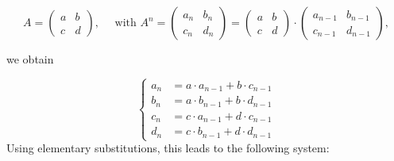 \documentclass[oneside,10pt]{book}
\renewcommand{\arraystretch}{1.4} %
\begin{document}
\renewcommand{\arraystretch}{1.0} %

\begin{equation*}
A =
\begin{pmatrix}
a & b \\
c & d
\end{pmatrix},
\quad
\text{ with }
A^n =
\begin{pmatrix}
a_n & b_n \\
c _n & d_n
\end{pmatrix}
=
\begin{pmatrix}
a & b \\
c & d
\end{pmatrix}
\cdot
\begin{pmatrix}
a_{n-1} & b_{n-1} \\
c_{n-1} & d_{n-1}
\end{pmatrix},
\end{equation*}

\noindent we obtain

\begin{equation*}
  \left\{
    \begin{aligned}
      a_n & =a\cdot a_{n-1}+b\cdot c_{n-1}\\
      b_n & =a\cdot b_{n-1}+b\cdot d_{n-1}\\
      c_n & =c\cdot a_{n-1}+d\cdot c_{n-1}\\
      d_n & =c\cdot b_{n-1}+d\cdot d_{n-1}
    \end{aligned}
  \right.
\end{equation*}
Using elementary substitutions, this leads to the following system:
\end{document}
